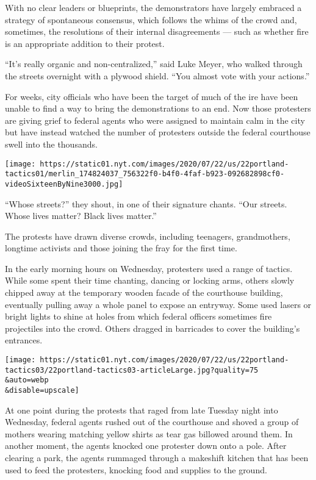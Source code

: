 With no clear leaders or blueprints, the demonstrators have largely
embraced a strategy of spontaneous consensus, which follows the whims of
the crowd and, sometimes, the resolutions of their internal
disagreements --- such as whether fire is an appropriate addition to
their protest.

``It's really organic and non-centralized,'' said Luke Meyer, who walked
through the streets overnight with a plywood shield. ``You almost vote
with your actions.''

For weeks, city officials who have been the target of much of the ire
have been unable to find a way to bring the demonstrations to an end.
Now those protesters are giving grief to federal agents who were
assigned to maintain calm in the city but have instead watched the
number of protesters outside the federal courthouse swell into the
thousands.

\texttt{[image: https://static01.nyt.com/images/2020/07/22/us/22portland-tactics01/merlin\_174824037\_756322f0-b4f0-4faf-b923-092682898cf0-videoSixteenByNine3000.jpg]}

``Whose streets?'' they shout, in one of their signature chants. ``Our
streets. Whose lives matter? Black lives matter.''

The protests have drawn diverse crowds, including teenagers,
grandmothers, longtime activists and those joining the fray for the
first time.

In the early morning hours on Wednesday, protesters used a range of
tactics. While some spent their time chanting, dancing or locking arms,
others slowly chipped away at the temporary wooden facade of the
courthouse building, eventually pulling away a whole panel to expose an
entryway. Some used lasers or bright lights to shine at holes from which
federal officers sometimes fire projectiles into the crowd. Others
dragged in barricades to cover the building's entrances.

\texttt{[image: https://static01.nyt.com/images/2020/07/22/us/22portland-tactics03/22portland-tactics03-articleLarge.jpg?quality=75\\\&auto=webp\\\&disable=upscale]}

At one point during the protests that raged from late Tuesday night into
Wednesday, federal agents rushed out of the courthouse and shoved a
group of mothers wearing matching yellow shirts as tear gas billowed
around them. In another moment, the agents knocked one protester down
onto a pole. After clearing a park, the agents rummaged through a
makeshift kitchen that has been used to feed the protesters, knocking
food and supplies to the ground.

